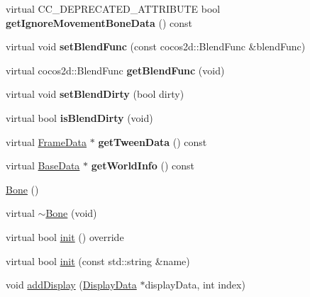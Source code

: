 \begin{DoxyCompactItemize}
\mbox{\label{classcocostudio_1_1Bone_aed65008b6c57d92cd5e649489d374f39}} 
virtual C\+C\+\_\+\+D\+E\+P\+R\+E\+C\+A\+T\+E\+D\+\_\+\+A\+T\+T\+R\+I\+B\+U\+TE bool {\bfseries get\+Ignore\+Movement\+Bone\+Data} () const
\item 
\mbox{\label{classcocostudio_1_1Bone_aa962b2ebaad93f61a87267a3292a6221}} 
virtual void {\bfseries set\+Blend\+Func} (const cocos2d\+::\+Blend\+Func \&blend\+Func)
\item 
\mbox{\label{classcocostudio_1_1Bone_a99c8c0fb967b5d0fc6239a9c385e2adb}} 
virtual cocos2d\+::\+Blend\+Func {\bfseries get\+Blend\+Func} (void)
\item 
\mbox{\label{classcocostudio_1_1Bone_a883f602b718e22ffcdda837ed529a719}} 
virtual void {\bfseries set\+Blend\+Dirty} (bool dirty)
\item 
\mbox{\label{classcocostudio_1_1Bone_a3115f15f64018a2175c289b28456cf82}} 
virtual bool {\bfseries is\+Blend\+Dirty} (void)
\item 
\mbox{\label{classcocostudio_1_1Bone_a09bd605c4def36f7ceeb42267c8b0a33}} 
virtual \hyperlink{classcocostudio_1_1FrameData}{Frame\+Data} $\ast$ {\bfseries get\+Tween\+Data} () const
\item 
\mbox{\label{classcocostudio_1_1Bone_a3d986782e73fdb95d9c80f8b454f86df}} 
virtual \hyperlink{classcocostudio_1_1BaseData}{Base\+Data} $\ast$ {\bfseries get\+World\+Info} () const
\item 
\hyperlink{classcocostudio_1_1Bone_a4ea993c9f4f8b5f2396087e86051d801}{Bone} ()
\item 
virtual \hyperlink{classcocostudio_1_1Bone_afcf24798154f0eaeee85ef60e0df7924}{$\sim$\+Bone} (void)
\item 
virtual bool \hyperlink{classcocostudio_1_1Bone_aa5f72eb1a7b5593b3c0f9ad4bf3a3b71}{init} () override
\item 
virtual bool \hyperlink{classcocostudio_1_1Bone_a4d24218f2ff8e9edb8f85c9ea11cd066}{init} (const std\+::string \&name)
\item 
void \hyperlink{classcocostudio_1_1Bone_a9400051f055db9419231d6fb516bcd78}{add\+Display} (\hyperlink{classcocostudio_1_1DisplayData}{Display\+Data} $\ast$display\+Data, int index)

\end{DoxyCompactItemize}
